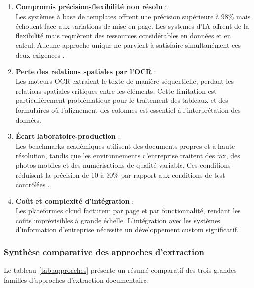 \begin{enumerate}

\item \textbf{Compromis précision-flexibilité non résolu} :\\
Les systèmes à base de templates offrent une précision supérieure à 98\% mais échouent face aux variations de mise en page. Les systèmes d'IA offrent de la flexibilité mais requièrent des ressources considérables en données et en calcul. Aucune approche unique ne parvient à satisfaire simultanément ces deux exigences \cite{borchmann2021due}.

\item \textbf{Perte des relations spatiales par l'OCR} :\\
Les moteurs OCR extraient le texte de manière séquentielle, perdant les relations spatiales critiques entre les éléments. Cette limitation est particulièrement problématique pour le traitement des tableaux et des formulaires où l'alignement des colonnes est essentiel à l'interprétation des données.

\item \textbf{Écart laboratoire-production} :\\
Les benchmarks académiques utilisent des documents propres et à haute résolution, tandis que les environnements d'entreprise traitent des fax, des photos mobiles et des numérisations de qualité variable. Ces conditions réduisent la précision de 10 à 30\% par rapport aux conditions de test contrôlées \cite{hegghammer2022ocr}.

\item \textbf{Coût et complexité d'intégration} :\\
Les plateformes cloud facturent par page et par fonctionnalité, rendant les coûts imprévisibles à grande échelle. L'intégration avec les systèmes d'information d'entreprise nécessite un développement custom significatif.

\end{enumerate}


\subsubsection{Synthèse comparative des approches d'extraction}

Le tableau~\ref{tab:approaches} présente un résumé comparatif des trois grandes familles d'approches d'extraction documentaire.

